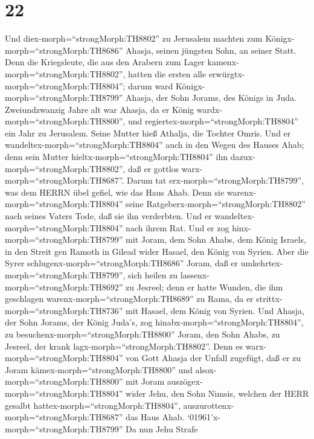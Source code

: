\hypertarget{section-21}{%
\section{22}\label{section-21}}

 Und diex-morph=``strongMorph:TH8802'' zu Jerusalem machten
zum Königx-morph=``strongMorph:TH8686'' Ahasja, seinen jüngsten Sohn, an
seiner Statt. Denn die Kriegsleute, die aus den Arabern zum Lager
kamenx-morph=``strongMorph:TH8802'', hatten die ersten alle
erwürgtx-morph=``strongMorph:TH8804''; darum ward
Königx-morph=``strongMorph:TH8799'' Ahasja, der Sohn Jorams, des Königs
in Juda.  Zweiundzwanzig Jahre alt war Ahasja, da er König
wardx-morph=``strongMorph:TH8800'', und
regiertex-morph=``strongMorph:TH8804'' ein Jahr zu Jerusalem. Seine
Mutter hieß Athalja, die Tochter Omris.  Und er
wandeltex-morph=``strongMorph:TH8804'' auch in den Wegen des Hauses
Ahab; denn sein Mutter hieltx-morph=``strongMorph:TH8804'' ihn
dazux-morph=``strongMorph:TH8802'', daß er gottlos
warx-morph=``strongMorph:TH8687''.  Darum tat
erx-morph=``strongMorph:TH8799'', was dem HERRN übel gefiel, wie das
Haus Ahab. Denn sie warenx-morph=``strongMorph:TH8804'' seine
Ratgeberx-morph=``strongMorph:TH8802'' nach seines Vaters Tode, daß sie
ihn verderbten.  Und er
wandeltex-morph=``strongMorph:TH8804'' nach ihrem Rat. Und er zog
hinx-morph=``strongMorph:TH8799'' mit Joram, dem Sohn Ahabs, dem König
Israels, in den Streit gen Ramoth in Gilead wider Hasael, den König von
Syrien. Aber die Syrer schlugenx-morph=``strongMorph:TH8686'' Joram,
 daß er umkehrtex-morph=``strongMorph:TH8799'', sich heilen
zu lassenx-morph=``strongMorph:TH8692'' zu Jesreel; denn er hatte
Wunden, die ihm geschlagen warenx-morph=``strongMorph:TH8689'' zu Rama,
da er strittx-morph=``strongMorph:TH8736'' mit Hasael, dem König von
Syrien. Und Ahasja, der Sohn Jorams, der König Juda's, zog
hinabx-morph=``strongMorph:TH8804'', zu
besuchenx-morph=``strongMorph:TH8800'' Joram, den Sohn Ahabs, zu
Jesreel, der krank lagx-morph=``strongMorph:TH8802''.  Denn
es warx-morph=``strongMorph:TH8804'' von Gott Ahasja der Unfall
zugefügt, daß er zu Joram kämex-morph=``strongMorph:TH8800'' und
alsox-morph=``strongMorph:TH8800'' mit Joram
auszögex-morph=``strongMorph:TH8804'' wider Jehu, den Sohn Nimsis,
welchen der HERR gesalbt hattex-morph=``strongMorph:TH8804'',
auszurottenx-morph=``strongMorph:TH8687'' das Haus Ahab. 
`01961'\textbar x-morph=``strongMorph:TH8799'' Da nun Jehu Strafe
